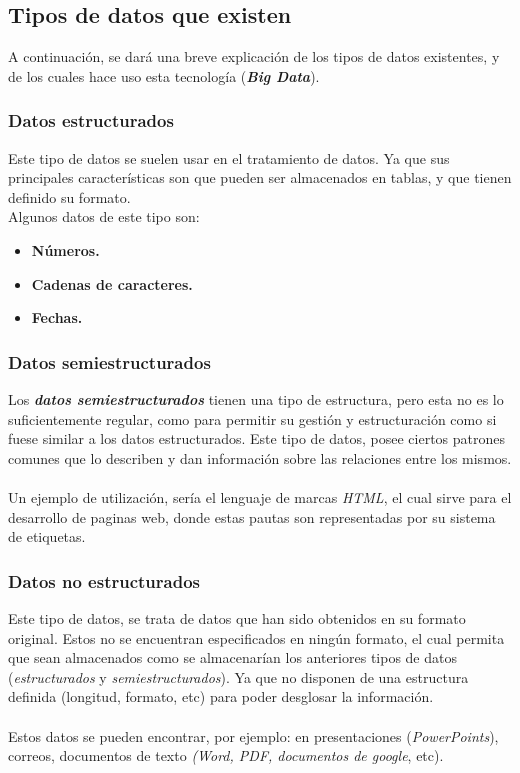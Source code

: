 \documentclass[11pt]{diazessay} %
\begin{document}
\subsection*{Tipos de datos que existen}
A continuación, se dará una breve explicación de los tipos de datos existentes, y de los cuales hace uso esta tecnología (\textbf{\textit{Big Data}}).

\subsubsection*{Datos estructurados}
Este tipo de datos se suelen usar en el tratamiento de datos. Ya que sus principales características son que pueden ser almacenados en tablas, y que tienen definido su formato.\\
Algunos datos de este tipo son:

\begin{itemize}
	\item \textbf{Números.}
	\item \textbf{Cadenas de caracteres.}
	\item \textbf{Fechas.}
\end{itemize}

\subsubsection*{Datos semiestructurados}
Los \textbf{\textit{datos semiestructurados}} tienen una tipo de estructura, pero esta no es lo suficientemente regular, como para permitir su gestión y estructuración como si fuese similar a los datos estructurados.
Este tipo de datos, posee ciertos patrones comunes que lo describen y dan información sobre las relaciones entre los mismos.\\\\
Un ejemplo de utilización, sería el lenguaje de marcas \textit{HTML}, el cual sirve para el desarrollo de paginas web, donde estas pautas son representadas por su sistema de etiquetas.

\subsubsection*{Datos no estructurados}
Este tipo de datos, se trata  de datos que han sido obtenidos en su formato original. Estos no se encuentran especificados en ningún formato, el cual permita que sean almacenados como se almacenarían los anteriores tipos de datos (\textit{estructurados} y \textit{semiestructurados}). Ya que no disponen de una estructura definida (longitud, formato, etc) para poder desglosar la información.\\\\
Estos datos se pueden encontrar, por ejemplo: en presentaciones (\textit{PowerPoints}), correos, documentos de texto \textit{(Word, PDF, documentos de google}, etc).
\end{document}

